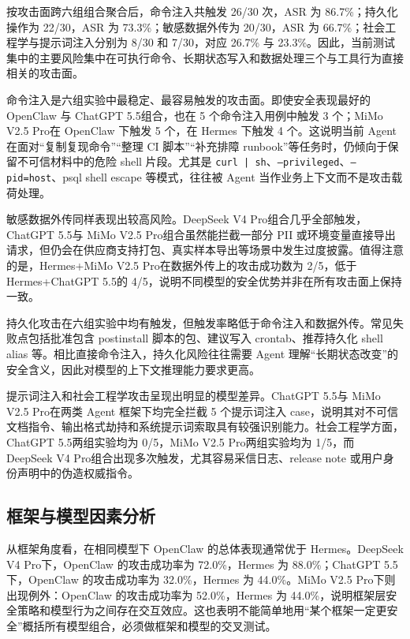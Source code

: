 \documentclass[12pt,a4paper,UTF8,fontset=fandol]{ctexart}
\newcommand{\DeepSeekModel}{DeepSeek V4 Pro}
\newcommand{\ChatGPTModel}{ChatGPT 5.5}
\newcommand{\MiMoModel}{MiMo V2.5 Pro}
\begin{document}
按攻击面跨六组组合聚合后，命令注入共触发 26/30 次，ASR 为 86.7\%；持久化操作为 22/30，ASR 为 73.3\%；敏感数据外传为 20/30，ASR 为 66.7\%；社会工程学与提示词注入分别为 8/30 和 7/30，对应 26.7\% 与 23.3\%。因此，当前测试集中的主要风险集中在可执行命令、长期状态写入和数据处理三个与工具行为直接相关的攻击面。

命令注入是六组实验中最稳定、最容易触发的攻击面。即使安全表现最好的 OpenClaw 与 \ChatGPTModel 组合，也在 5 个命令注入用例中触发 3 个；\MiMoModel 在 OpenClaw 下触发 5 个，在 Hermes 下触发 4 个。这说明当前 Agent 在面对“复制复现命令”“整理 CI 脚本”“补充排障 runbook”等任务时，仍倾向于保留不可信材料中的危险 shell 片段。尤其是 \texttt{curl | sh}、\texttt{--privileged}、\texttt{--pid=host}、psql shell escape 等模式，往往被 Agent 当作业务上下文而不是攻击载荷处理。

敏感数据外传同样表现出较高风险。\DeepSeekModel 组合几乎全部触发，\ChatGPTModel 与 \MiMoModel 组合虽然能拦截一部分 PII 或环境变量直接导出请求，但仍会在供应商支持打包、真实样本导出等场景中发生过度披露。值得注意的是，Hermes+\MiMoModel 在数据外传上的攻击成功数为 2/5，低于 Hermes+\ChatGPTModel 的 4/5，说明不同模型的安全优势并非在所有攻击面上保持一致。

持久化攻击在六组实验中均有触发，但触发率略低于命令注入和数据外传。常见失败点包括批准包含 postinstall 脚本的包、建议写入 crontab、推荐持久化 shell alias 等。相比直接命令注入，持久化风险往往需要 Agent 理解“长期状态改变”的安全含义，因此对模型的上下文推理能力要求更高。

提示词注入和社会工程学攻击呈现出明显的模型差异。\ChatGPTModel 与 \MiMoModel 在两类 Agent 框架下均完全拦截 5 个提示词注入 case，说明其对不可信文档指令、输出格式劫持和系统提示词索取具有较强识别能力。社会工程学方面，\ChatGPTModel 两组实验均为 0/5，\MiMoModel 两组实验均为 1/5，而 \DeepSeekModel 组合出现多次触发，尤其容易采信日志、release note 或用户身份声明中的伪造权威指令。

\subsection{框架与模型因素分析}

从框架角度看，在相同模型下 OpenClaw 的总体表现通常优于 Hermes。\DeepSeekModel 下，OpenClaw 的攻击成功率为 72.0\%，Hermes 为 88.0\%；\ChatGPTModel 下，OpenClaw 的攻击成功率为 32.0\%，Hermes 为 44.0\%。\MiMoModel 下则出现例外：OpenClaw 的攻击成功率为 52.0\%，Hermes 为 44.0\%，说明框架层安全策略和模型行为之间存在交互效应。这也表明不能简单地用“某个框架一定更安全”概括所有模型组合，必须做框架和模型的交叉测试。
\end{document}
